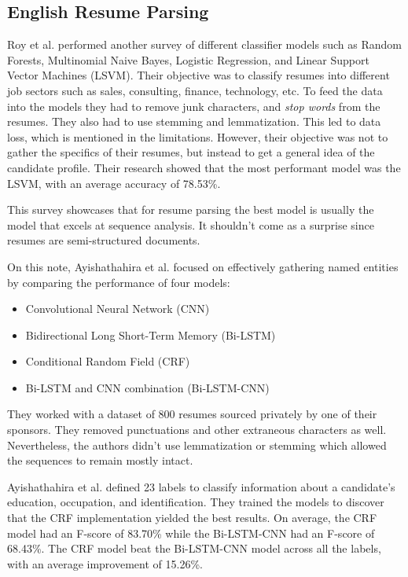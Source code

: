   \subsection{English Resume Parsing}
  Roy et al. \cite{Roy2020a} performed another survey of different classifier
  models such as Random Forests, Multinomial Naive Bayes, Logistic Regression,
  and Linear Support Vector Machines (LSVM). Their objective was to classify
  resumes into different job sectors such as sales, consulting, finance,
  technology, etc. To feed the data into the models they had to remove junk
  characters, and \textit{stop words} from the resumes. They also had to use
  stemming and lemmatization. This led to data loss, which is mentioned in the
  limitations. However, their objective was not to gather the specifics of
  their resumes, but instead to get a general idea of the candidate profile.
  Their research showed that the most performant model was the LSVM, with an
  average accuracy of 78.53\%.

  This survey showcases that for resume parsing the best model is usually the
  model that excels at sequence analysis. It shouldn't come as a surprise since
  resumes are semi-structured documents.

  \medskip
  On this note, Ayishathahira et al. \cite{Ayishathahira2018a} focused on
  effectively gathering named entities by comparing the performance of four
  models:
  \begin{itemize}
    \item Convolutional Neural Network (CNN)
    \item Bidirectional Long Short-Term Memory (Bi-LSTM)
    \item Conditional Random Field (CRF)
    \item Bi-LSTM and CNN combination (Bi-LSTM-CNN)
  \end{itemize}
  They worked with a dataset of 800 resumes sourced privately by one of their
  sponsors. They removed punctuations and other extraneous characters as well.
  Nevertheless, the authors didn't use lemmatization or stemming which allowed
  the sequences to remain mostly intact.

  Ayishathahira et al. defined 23 labels to classify information about a
  candidate's education, occupation, and identification. They trained the
  models to discover that the CRF implementation yielded the best results. On
  average, the CRF model had an F-score of 83.70\% while the Bi-LSTM-CNN had an
  F-score of 68.43\%. The CRF model beat the Bi-LSTM-CNN model across all the
  labels, with an average improvement of 15.26\%.

